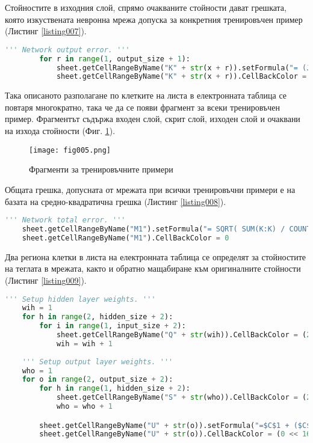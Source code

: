 Стойностите в изходния слой, спрямо очакваните стойности дават грешката, която изкуствената невронна мрежа допуска за конкретния тренировъчен пример (Листинг \ref{listing007}).

\begin{lstlisting}[caption=Стойност на грешката допусната от мрежата за конкретния пример, language=Python, basicstyle=\tiny, label=listing007]
        ''' Network output error. '''
        for r in range(1, output_size + 1):
            sheet.getCellRangeByName("K" + str(x + r)).setFormula("= (J" + str(x + r) + "-I" + str(x + r) + ") * (J" + str(x + r) + "-I" + str(x + r) + ")")
            sheet.getCellRangeByName("K" + str(x + r)).CellBackColor = (0 << 16 | 255 << 8 | 255)
\end{lstlisting}

Така описаното разполагане по клетките на листа в електронната таблица се повтаря многократно, така че да се появи фрагмент за всеки тренировъчен пример. Фрагментът съдържа входен слой, скрит слой, изходен слой и очаквани на изхода стойности (Фиг. \ref{fig005}).

\begin{figure}[h]
  \centering
  \texttt{[image: fig005.png]}
  \caption{Фрагменти за тренировъчните примери}
\label{fig005}
\end{figure}

Общата грешка, допусната от мрежата при всички тренировъчни примери е на базата на средно-квадратична грешка (Листинг \ref{listing008}).

\begin{lstlisting}[caption=Обща средно-квадратична грешка на мрежата, language=Python, basicstyle=\tiny, label=listing008]
    ''' Network total error. '''
    sheet.getCellRangeByName("M1").setFormula("= SQRT( SUM(K:K) / COUNT(K:K) )")
    sheet.getCellRangeByName("M1").CellBackColor = 0
\end{lstlisting}

Два региона клетки в листа на електронната таблица се определят за стойностите на теглата в мрежата, както и обратно мащабиране към оригиналните стойности (Листинг \ref{listing009}).

\begin{lstlisting}[caption=Определяне на региони за теглата на мрежата, language=Python, basicstyle=\tiny, label=listing009]
    ''' Setup hidden layer weights. '''
    wih = 1
    for h in range(2, hidden_size + 2):
        for i in range(1, input_size + 2):
            sheet.getCellRangeByName("Q" + str(wih)).CellBackColor = (255 << 16 | 0 << 8 | 255)
            wih = wih + 1
        
    ''' Setup output layer weights. '''
    who = 1
    for o in range(2, output_size + 2):
        for h in range(1, hidden_size + 2):
            sheet.getCellRangeByName("S" + str(who)).CellBackColor = (255 << 16 | 0 << 8 | 255)
            who = who + 1

        sheet.getCellRangeByName("U" + str(o)).setFormula("=$C$1 + ($C$2 - $C$1) * ((T" + str(o) + " - $C$4) / ($C$5 - $C$4))")
        sheet.getCellRangeByName("U" + str(o)).CellBackColor = (0 << 16 | 127 << 8 | 0)
\end{lstlisting}

